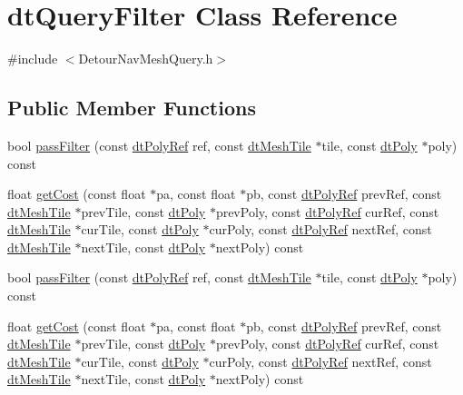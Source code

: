 \hypertarget{classdtQueryFilter}{}\section{dt\+Query\+Filter Class Reference}
\label{classdtQueryFilter}


{\ttfamily \#include $<$Detour\+Nav\+Mesh\+Query.\+h$>$}

\subsection*{Public Member Functions}
\begin{DoxyCompactItemize}
\item 
bool \hyperlink{classdtQueryFilter_aaf072b8617dfbd4701a8e07f0f10be9c}{pass\+Filter} (const \hyperlink{group__detour_gab4e0b2257a670c1a800057999612b466}{dt\+Poly\+Ref} ref, const \hyperlink{structdtMeshTile}{dt\+Mesh\+Tile} $\ast$tile, const \hyperlink{structdtPoly}{dt\+Poly} $\ast$poly) const
\item 
float \hyperlink{classdtQueryFilter_a11d016505b732a1a013c3771a4157dea}{get\+Cost} (const float $\ast$pa, const float $\ast$pb, const \hyperlink{group__detour_gab4e0b2257a670c1a800057999612b466}{dt\+Poly\+Ref} prev\+Ref, const \hyperlink{structdtMeshTile}{dt\+Mesh\+Tile} $\ast$prev\+Tile, const \hyperlink{structdtPoly}{dt\+Poly} $\ast$prev\+Poly, const \hyperlink{group__detour_gab4e0b2257a670c1a800057999612b466}{dt\+Poly\+Ref} cur\+Ref, const \hyperlink{structdtMeshTile}{dt\+Mesh\+Tile} $\ast$cur\+Tile, const \hyperlink{structdtPoly}{dt\+Poly} $\ast$cur\+Poly, const \hyperlink{group__detour_gab4e0b2257a670c1a800057999612b466}{dt\+Poly\+Ref} next\+Ref, const \hyperlink{structdtMeshTile}{dt\+Mesh\+Tile} $\ast$next\+Tile, const \hyperlink{structdtPoly}{dt\+Poly} $\ast$next\+Poly) const
\item 
bool \hyperlink{classdtQueryFilter_aaf072b8617dfbd4701a8e07f0f10be9c}{pass\+Filter} (const \hyperlink{group__detour_gab4e0b2257a670c1a800057999612b466}{dt\+Poly\+Ref} ref, const \hyperlink{structdtMeshTile}{dt\+Mesh\+Tile} $\ast$tile, const \hyperlink{structdtPoly}{dt\+Poly} $\ast$poly) const
\item 
float \hyperlink{classdtQueryFilter_a11d016505b732a1a013c3771a4157dea}{get\+Cost} (const float $\ast$pa, const float $\ast$pb, const \hyperlink{group__detour_gab4e0b2257a670c1a800057999612b466}{dt\+Poly\+Ref} prev\+Ref, const \hyperlink{structdtMeshTile}{dt\+Mesh\+Tile} $\ast$prev\+Tile, const \hyperlink{structdtPoly}{dt\+Poly} $\ast$prev\+Poly, const \hyperlink{group__detour_gab4e0b2257a670c1a800057999612b466}{dt\+Poly\+Ref} cur\+Ref, const \hyperlink{structdtMeshTile}{dt\+Mesh\+Tile} $\ast$cur\+Tile, const \hyperlink{structdtPoly}{dt\+Poly} $\ast$cur\+Poly, const \hyperlink{group__detour_gab4e0b2257a670c1a800057999612b466}{dt\+Poly\+Ref} next\+Ref, const \hyperlink{structdtMeshTile}{dt\+Mesh\+Tile} $\ast$next\+Tile, const \hyperlink{structdtPoly}{dt\+Poly} $\ast$next\+Poly) const
\end{DoxyCompactItemize}
